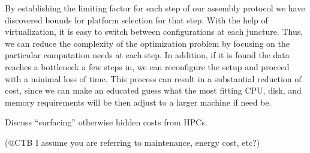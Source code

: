 By establishing the limiting factor for each step of our assembly
protocol  we have discovered bounds for platform selection for that
step. With the help of virtualization, it is easy to switch between
configurations at each juncture. Thus, we can reduce the complexity
of the optimization problem by focusing on the particular computation
needs at each step. In addition, if it is found the data reaches a
bottleneck a few steps in, we can reconfigure the setup and proceed
with a minimal loss of time. This process can result in a  substantial
reduction of cost, since we can make an educated guess what the  most
fitting CPU, disk, and memory requirements will be then adjust to a
larger machine if need be.

Discuss ``surfacing'' otherwise hidden costs from HPCs.

(@CTB I assume you are referring to maintenance, energy cost, etc?)



